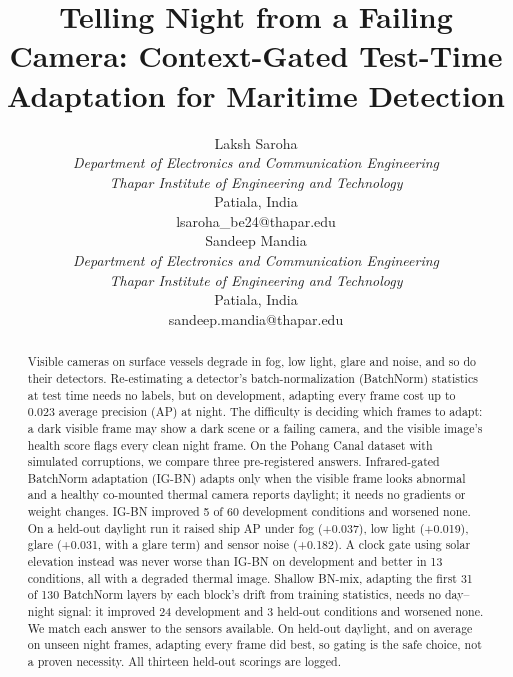 \documentclass[journal]{IEEEtran}
\begin{document}
\title{Telling Night from a Failing Camera: Context-Gated Test-Time Adaptation for Maritime Detection}

\author{{\small\begin{tabular}[t]{@{}c@{}}
\normalsize Laksh Saroha\\
\textit{Department of Electronics and Communication Engineering}\\
\textit{Thapar Institute of Engineering and Technology}\\
Patiala, India\\
lsaroha\_be24@thapar.edu
\end{tabular}}
\hspace{2.5em}
{\small\begin{tabular}[t]{@{}c@{}}
\normalsize Sandeep Mandia\\
\textit{Department of Electronics and Communication Engineering}\\
\textit{Thapar Institute of Engineering and Technology}\\
Patiala, India\\
sandeep.mandia@thapar.edu
\end{tabular}}}


\maketitle

\begin{abstract}
Visible cameras on surface vessels degrade in fog, low light, glare and noise, and so do their detectors. Re-estimating a detector's batch-normalization (BatchNorm) statistics at test time needs no labels, but on development, adapting every frame cost up to 0.023 average precision (AP) at night. The difficulty is deciding which frames to adapt: a dark visible frame may show a dark scene or a failing camera, and the visible image's health score flags every clean night frame. On the Pohang Canal dataset with simulated corruptions, we compare three pre-registered answers. Infrared-gated BatchNorm adaptation (IG-BN) adapts only when the visible frame looks abnormal and a healthy co-mounted thermal camera reports daylight; it needs no gradients or weight changes. IG-BN improved 5 of 60 development conditions and worsened none. On a held-out daylight run it raised ship AP under fog (+0.037), low light (+0.019), glare (+0.031, with a glare term) and sensor noise (+0.182). A clock gate using solar elevation instead was never worse than IG-BN on development and better in 13 conditions, all with a degraded thermal image. Shallow BN-mix, adapting the first 31 of 130 BatchNorm layers by each block's drift from training statistics, needs no day--night signal: it improved 24 development and 3 held-out conditions and worsened none. We match each answer to the sensors available. On held-out daylight, and on average on unseen night frames, adapting every frame did best, so gating is the safe choice, not a proven necessity. All thirteen held-out scorings are logged.
\end{abstract}
\end{document}

